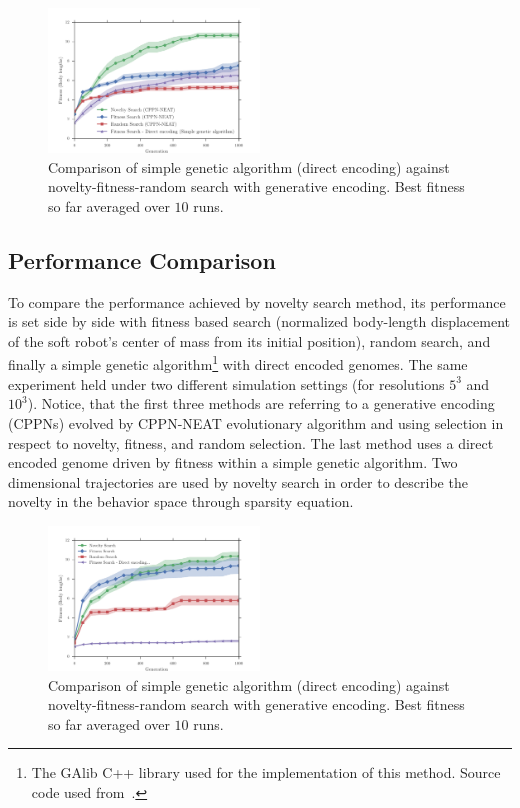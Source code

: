 \documentclass{sig-alternate}
\begin{document}
\begin{figure}[b!]
\centering
\includegraphics[width=0.5\textwidth]{../Figures/Results/FitNovRandomDirectSize5.pdf}
\caption{Comparison of simple genetic algorithm (direct encoding) against novelty-fitness-random search with generative encoding. Best fitness so far averaged over $10$ runs.}
\label{fig:FitNovRandomDirectSize5}
\vspace{-15pt}
\end{figure}

\subsection{Performance Comparison}

To compare the performance achieved by novelty search method, its performance is set side by side with fitness based search (normalized body-length displacement of the soft robot's center of mass from its initial position), random search, and finally a simple genetic algorithm\footnote{The GAlib C++ library \cite{wall1996galib} used for the implementation of this method. Source code used from~\cite{cheney2013unshackling}.} with direct encoded genomes. The same experiment held under two different simulation settings (for resolutions $5^3$ and $10^3$). Notice, that the first three methods are referring to a generative encoding (CPPNs) evolved by CPPN-NEAT evolutionary algorithm and using selection in respect to novelty, fitness, and random selection. The last method uses a direct encoded genome driven by fitness within a simple genetic algorithm. Two dimensional trajectories are used by novelty search in order to describe the novelty in the behavior space through sparsity equation.

\begin{figure}[t!]
\centering
\includegraphics[width=0.5\textwidth]{../Figures/Results/FitvsNovVsDirSize10.pdf}
\caption{Comparison of simple genetic algorithm (direct encoding) against novelty-fitness-random search with generative encoding. Best fitness so far averaged over $10$ runs.}
\label{fig:FitvsNovVsDirSize10}
\vspace{-15pt}
\end{figure} 
\end{document}
